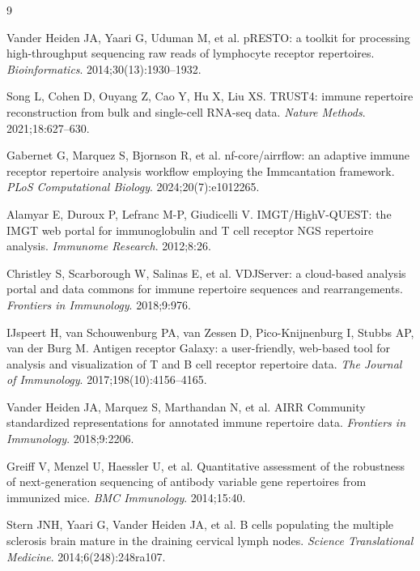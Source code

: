 \documentclass[unnumsec,webpdf,contemporary,large]{oup-authoring-template}
\begin{document}
\begin{thebibliography}{9}

Vander Heiden JA, Yaari G, Uduman M, et al. pRESTO: a toolkit for processing high-throughput sequencing raw reads of lymphocyte receptor repertoires. \textit{Bioinformatics}. 2014;30(13):1930--1932.

Song L, Cohen D, Ouyang Z, Cao Y, Hu X, Liu XS. TRUST4: immune repertoire reconstruction from bulk and single-cell RNA-seq data. \textit{Nature Methods}. 2021;18:627--630.

Gabernet G, Marquez S, Bjornson R, et al. nf-core/airrflow: an adaptive immune receptor repertoire analysis workflow employing the Immcantation framework. \textit{PLoS Computational Biology}. 2024;20(7):e1012265.

Alamyar E, Duroux P, Lefranc M-P, Giudicelli V. IMGT/HighV-QUEST: the IMGT web portal for immunoglobulin and T cell receptor NGS repertoire analysis. \textit{Immunome Research}. 2012;8:26.

Christley S, Scarborough W, Salinas E, et al. VDJServer: a cloud-based analysis portal and data commons for immune repertoire sequences and rearrangements. \textit{Frontiers in Immunology}. 2018;9:976.

IJspeert H, van Schouwenburg PA, van Zessen D, Pico-Knijnenburg I, Stubbs AP, van der Burg M. Antigen receptor Galaxy: a user-friendly, web-based tool for analysis and visualization of T and B cell receptor repertoire data. \textit{The Journal of Immunology}. 2017;198(10):4156--4165.

Vander Heiden JA, Marquez S, Marthandan N, et al. AIRR Community standardized representations for annotated immune repertoire data. \textit{Frontiers in Immunology}. 2018;9:2206.

Greiff V, Menzel U, Haessler U, et al. Quantitative assessment of the robustness of next-generation sequencing of antibody variable gene repertoires from immunized mice. \textit{BMC Immunology}. 2014;15:40.

Stern JNH, Yaari G, Vander Heiden JA, et al. B cells populating the multiple sclerosis brain mature in the draining cervical lymph nodes. \textit{Science Translational Medicine}. 2014;6(248):248ra107.


\end{thebibliography}
\end{document}
